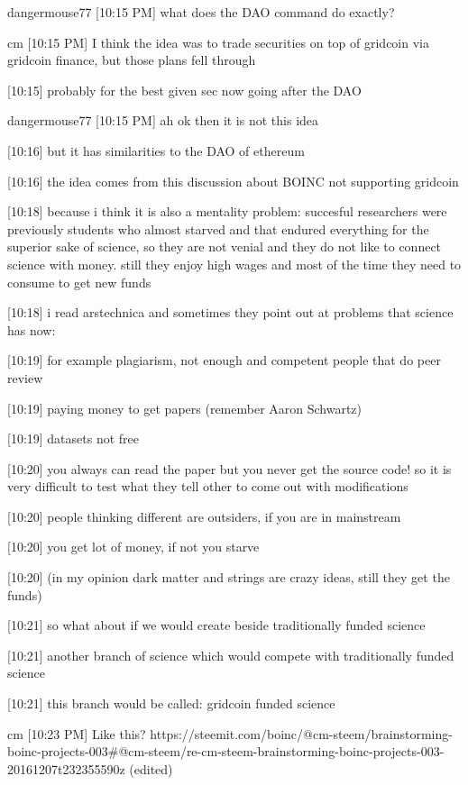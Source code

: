 {dangermouse77 [10:15 PM] 
what does the DAO command do exactly?


cm 
[10:15 PM] 
I think the idea was to trade securities on top of gridcoin via gridcoin finance, but those plans fell through


[10:15] 
probably for the best given sec now going after the DAO


dangermouse77 [10:15 PM] 
ah ok then it is not this idea


[10:16] 
but it has similarities to the DAO of ethereum


[10:16] 
the idea comes from this discussion about BOINC not supporting gridcoin


[10:18] 
because i think it is also a mentality problem: succesful researchers were previously students who almost starved and that endured everything for the superior sake of science, so they are not venial and they do not like to connect science with money. still they enjoy high wages and most of the time they need to consume to get new funds


[10:18] 
i read arstechnica and sometimes they point out at problems that science has now:


[10:19] 
for example plagiarism, not enough and competent people that do peer review


[10:19] 
paying money to get papers (remember Aaron Schwartz)


[10:19] 
datasets not free


[10:20] 
you always can read the paper but you never get the source code! so it is very difficult to test what they tell other to come out with modifications


[10:20] 
people thinking different are outsiders, if you are in mainstream


[10:20] 
you get lot of money, if not you starve


[10:20] 
(in my opinion dark matter and strings are crazy ideas, still they get the funds)


[10:21] 
so what about if we would create beside traditionally funded science


[10:21] 
another branch of science which would compete with traditionally funded science


[10:21] 
this branch would be called: gridcoin funded science


cm 
[10:23 PM] 
Like this? https://steemit.com/boinc/@cm-steem/brainstorming-boinc-projects-003#@cm-steem/re-cm-steem-brainstorming-boinc-projects-003-20161207t232355590z (edited)


}
